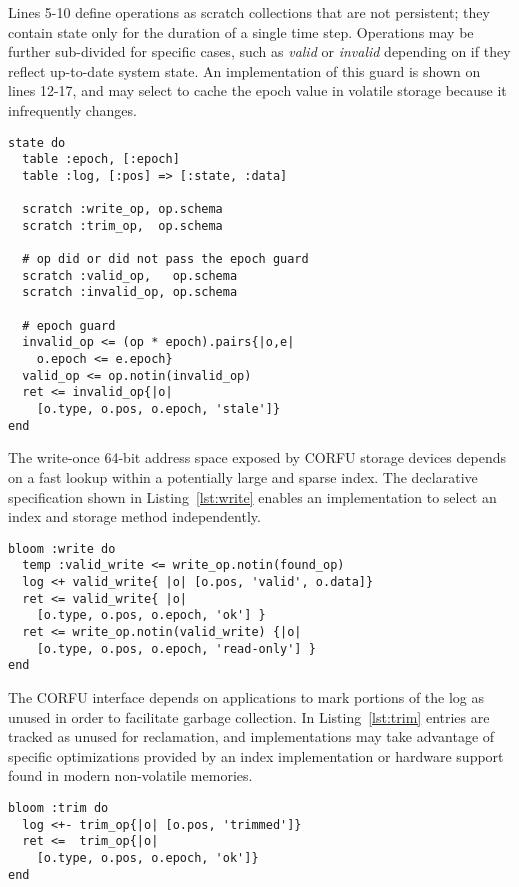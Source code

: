 Lines 5-10 define operations as scratch collections that are not persistent;
they contain state only for the duration of a single time step. Operations may
be further sub-divided for specific cases, such as \emph{valid} or
\emph{invalid} depending on if they reflect up-to-date system state.  An
implementation of this guard is shown on lines 12-17, and may select to cache
the epoch value in volatile storage because it infrequently changes.

\begin{lstlisting}[caption={State Declaration}, label=lst:state]
state do
  table :epoch, [:epoch]
  table :log, [:pos] => [:state, :data]

  scratch :write_op, op.schema
  scratch :trim_op,  op.schema

  # op did or did not pass the epoch guard
  scratch :valid_op,   op.schema
  scratch :invalid_op, op.schema

  # epoch guard
  invalid_op <= (op * epoch).pairs{|o,e|
    o.epoch <= e.epoch}
  valid_op <= op.notin(invalid_op)
  ret <= invalid_op{|o|
    [o.type, o.pos, o.epoch, 'stale']}
end
\end{lstlisting}

The write-once 64-bit address space exposed by CORFU storage devices depends
on a fast lookup within a potentially large and sparse index. The declarative
specification shown in Listing~\ref{lst:write} enables an implementation to
select an index and storage method independently.

\begin{lstlisting}[caption={Write}, label=lst:write]
bloom :write do
  temp :valid_write <= write_op.notin(found_op)
  log <+ valid_write{ |o| [o.pos, 'valid', o.data]}
  ret <= valid_write{ |o|
    [o.type, o.pos, o.epoch, 'ok'] }
  ret <= write_op.notin(valid_write) {|o|
    [o.type, o.pos, o.epoch, 'read-only'] }
end
\end{lstlisting}

The CORFU interface depends on applications to mark portions of the log as
unused in order to facilitate garbage collection.  In Listing~\ref{lst:trim}
entries are tracked as unused for reclamation, and implementations may take
advantage of specific optimizations provided by an index implementation or
hardware support found in modern non-volatile memories.

\begin{lstlisting}[caption={Trim}, label=lst:trim]
bloom :trim do
  log <+- trim_op{|o| [o.pos, 'trimmed']}
  ret <=  trim_op{|o|
    [o.type, o.pos, o.epoch, 'ok']}
end
\end{lstlisting}

